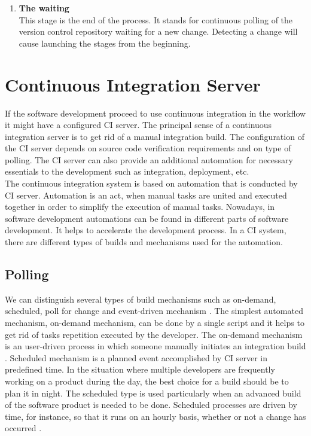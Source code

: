 \begin{enumerate}
    \item \textbf{The waiting}\\[0.1em]
          This stage is the end of the process. It stands for continuous polling of  the version control repository waiting for a new change. Detecting a change will cause launching the stages from the beginning.

\end{enumerate}

\section{Continuous Integration Server}

If the software development proceed to use continuous integration in the workflow it might have a configured CI server. The principal sense of a continuous integration server is to get rid of a manual integration build. The configuration of the CI server depends on source code verification requirements and on type of polling. The CI server can also provide an additional automation for necessary essentials to the development such as integration, deployment, etc.\\

The continuous integration system is based on automation that is conducted by CI server. Automation is an act, when manual tasks are united and executed together in order to simplify the execution of manual tasks. Nowadays, in software development automations can be found in different parts of software development. It helps to accelerate the development process. In a CI system, there are different types of builds and mechanisms used for the automation.

\subsection{Polling}

We can distinguish several types of build mechanisms such as on-demand, scheduled, poll for change and event-driven mechanism \cite{CIbook}. The simplest automated mechanism, on-demand mechanism, can be done by a single script and it helps to get rid of tasks repetition executed by the developer. The on-demand mechanism is an user-driven process in which someone manually initiates an integration build \cite{CIbook}. Scheduled mechanism is a planned event accomplished by CI server in predefined time. In the situation where multiple developers are frequently working on a product during the day, the best choice for a build should be to plan it in night. The scheduled type is used particularly when an advanced build of the software product is needed to be done. Scheduled processes are driven by time, for instance, so that it runs on an hourly basis, whether or not a change has occurred \cite{CIbook}.\\

